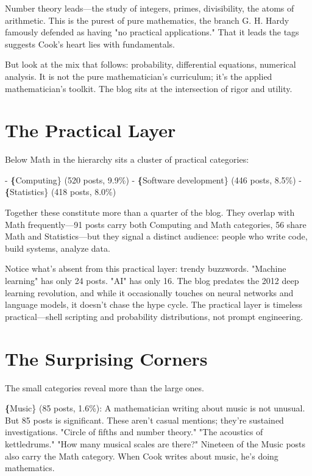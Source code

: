 Number theory leads—the study of integers, primes, divisibility, the atoms of arithmetic. This is the purest of pure mathematics, the branch G. H. Hardy famously defended as having "no practical applications." That it leads the tags suggests Cook's heart lies with fundamentals.

But look at the mix that follows: probability, differential equations, numerical analysis. It is not the pure mathematician's curriculum; it's the applied mathematician's toolkit. The blog sits at the intersection of rigor and utility.

\bigskip

\section*{The Practical Layer}

Below Math in the hierarchy sits a cluster of practical categories:

- \textbf\{Computing\} (520 posts, 9.9\%)
- \textbf\{Software development\} (446 posts, 8.5\%)
- \textbf\{Statistics\} (418 posts, 8.0\%)

Together these constitute more than a quarter of the blog. They overlap with Math frequently—91 posts carry both Computing and Math categories, 56 share Math and Statistics—but they signal a distinct audience: people who write code, build systems, analyze data.

Notice what's absent from this practical layer: trendy buzzwords. "Machine learning" has only 24 posts. "AI" has only 16. The blog predates the 2012 deep learning revolution, and while it occasionally touches on neural networks and language models, it doesn't chase the hype cycle. The practical layer is timeless practical—shell scripting and probability distributions, not prompt engineering.

\bigskip

\section*{The Surprising Corners}

The small categories reveal more than the large ones.

\textbf\{Music\} (85 posts, 1.6\%): A mathematician writing about music is not unusual. But 85 posts is significant. These aren't casual mentions; they're sustained investigations. "Circle of fifths and number theory." "The acoustics of kettledrums." "How many musical scales are there?" Nineteen of the Music posts also carry the Math category. When Cook writes about music, he's doing mathematics.

